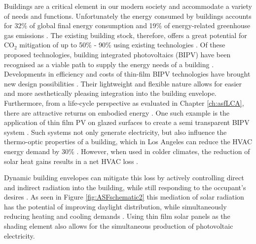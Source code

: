 

Buildings are a critical element in our modern society and accommodate a variety of needs and functions. Unfortunately the energy consumed by buildings accounts for 32\% of global final energy consumption and 19\% of energy-related greenhouse gas emissions \cite{IPCC}. The existing building stock, therefore, offers a great potential for CO$_2$ mitigation of up to 50\% - 90\% using existing technologies \cite{IPCC}. Of these proposed technologies, building integrated photovoltaics (BIPV) have been recognised as a viable path to supply the energy needs of a building \cite{defaix2012technical,raugei2009life}. \\


Developments in efficiency and costs of thin-film BIPV technologies have brought new design possibilities \cite{NREL, kushiya2014cis, kaelin2004low,jelle2012building}. Their lightweight and flexible nature allows for easier and more aesthetically pleasing integration into the building envelope. Furthermore, from a life-cycle perspective as evaluated in Chapter \ref{ch:asfLCA}, there are attractive returns on embodied energy \cite{perez2012faccade,jayathissa2016life}. One such example is the application of thin film PV on glazed surfaces to create a semi transparent BIPV system \cite{li2009energy,peng2016numerical,vats2012energy}. Such systems not only generate electricity, but also influence the thermo-optic properties of a building, which in Los Angeles can reduce the HVAC energy demand by 30\% \cite{chae2014building}. However, when used in colder climates, the reduction of solar heat gains results in a net HVAC loss \cite{chae2014building}.

Dynamic building envelopes can mitigate this loss by actively controlling direct and indirect radiation into the building, while still responding to the occupant's desires \cite{loonen2013climate}. As seen in Figure \ref{fig:ASFschematic2} this mediation of solar radiation has the potential of improving daylight distribution, while simultaneously reducing heating and cooling demands \cite{nagy2016adaptive}. Using thin film solar panels as the shading element also allows for the simultaneous production of photovoltaic electricity. \\



